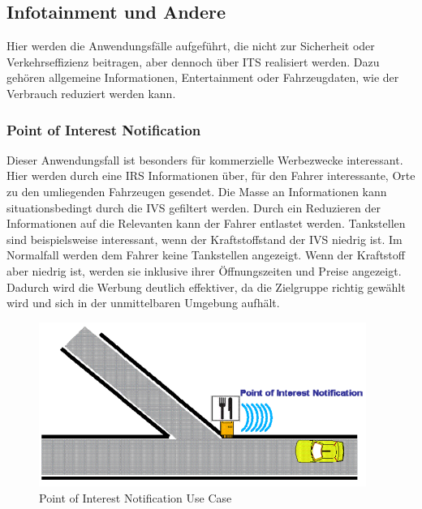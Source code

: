 \subsection{Infotainment und Andere}
Hier werden die Anwendungsfälle aufgeführt, die nicht zur Sicherheit oder Verkehrseffizienz beitragen, aber dennoch über \ac{ITS} realisiert werden. Dazu gehören allgemeine Informationen, Entertainment oder Fahrzeugdaten, wie der Verbrauch reduziert werden kann. 

\subsubsection{Point of Interest Notification}
Dieser Anwendungsfall ist besonders für kommerzielle Werbezwecke interessant. Hier werden durch eine \ac{IRS} Informationen über, für den Fahrer interessante, Orte zu den umliegenden Fahrzeugen gesendet. Die Masse an Informationen kann situationsbedingt durch die \ac{IVS} gefiltert werden. Durch ein Reduzieren der Informationen auf die Relevanten kann der Fahrer entlastet werden. Tankstellen sind beispielsweise interessant, wenn der Kraftstoffstand der \ac{IVS} niedrig ist. Im Normalfall werden dem Fahrer keine Tankstellen angezeigt. Wenn der Kraftstoff aber niedrig ist, werden sie inklusive ihrer Öffnungszeiten und Preise angezeigt. Dadurch wird die Werbung deutlich effektiver, da die Zielgruppe richtig gewählt wird und sich in der unmittelbaren Umgebung aufhält.

\begin{figure}[htbp]
\includegraphics[width=0.95\textwidth]{content/images/06_use_cases/poin.png}
\caption{Point of Interest Notification Use Case \cite{etsi102638}}
\label{fig:poin}
\end{figure}


